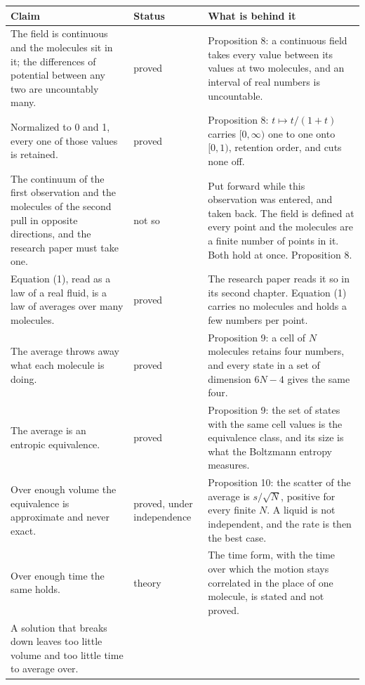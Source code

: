 \begin{longtable}{@{}>{\raggedright\arraybackslash}p{}%
>{\raggedright\arraybackslash}p{}%
>{\raggedright\arraybackslash}p{}@{}}
\toprule
Claim & Status & What is behind it \\
\midrule
\endhead
\bottomrule
\endfoot
The field is continuous and the molecules sit in it; the differences of potential between any two
are uncountably many.
& proved
& Proposition 8: a continuous field takes every value between its values at two molecules, and an
interval of real numbers is uncountable. \\[0.6em]
Normalized to 0 and 1, every one of those values is retained.
& proved
& Proposition 8: $t \mapsto t/(1+t)$ carries $[0,\infty)$ one to one onto $[0,1)$, retention order,
and cuts none off. \\[0.6em]
The continuum of the first observation and the molecules of the second pull in opposite
directions, and the research paper must take one.
& not so
& Put forward while this observation was entered, and taken back. The field is defined at every
point and the molecules are a finite number of points in it. Both hold at once. Proposition 8.
\\[0.6em]
Equation (1), read as a law of a real fluid, is a law of averages over many molecules.
& proved
& The research paper reads it so in its second chapter. Equation (1) carries no molecules and
holds a few numbers per point. \\[0.6em]
The average throws away what each molecule is doing.
& proved
& Proposition 9: a cell of $N$ molecules retains four numbers, and every state in a set of dimension
$6N-4$ gives the same four. \\[0.6em]
The average is an entropic equivalence.
& proved
& Proposition 9: the set of states with the same cell values is the equivalence class, and its size
is what the Boltzmann entropy measures. \\[0.6em]
Over enough volume the equivalence is approximate and never exact.
& proved, under independence
& Proposition 10: the scatter of the average is $s/\sqrt N$, positive for every finite $N$. A liquid
is not independent, and the rate is then the best case. \\[0.6em]
Over enough time the same holds.
& theory
& The time form, with the time over which the motion stays correlated in the place of one
molecule, is stated and not proved. \\[0.6em]
A solution that breaks down leaves too little volume and too little time to average over.

\end{longtable}
